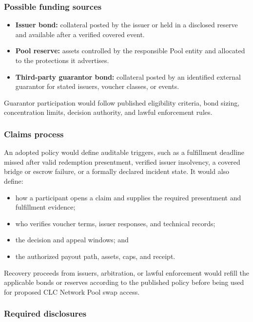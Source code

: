 \documentclass[11pt]{article}
\begin{document}
\subsubsection*{Possible funding sources}

\begin{itemize}[leftmargin=*]
\item \textbf{Issuer bond:} collateral posted by the issuer or held in a disclosed reserve and available after a verified covered event.
\item \textbf{Pool reserve:} assets controlled by the responsible Pool entity and allocated to the protections it advertises.
\item \textbf{Third-party guarantor bond:} collateral posted by an identified external guarantor for stated issuers, voucher classes, or events.
\end{itemize}
Guarantor participation would follow published eligibility criteria, bond sizing, concentration limits, decision authority, and lawful enforcement rules.

\subsubsection*{Claims process}

An adopted policy would define auditable triggers, such as a fulfillment deadline missed after valid redemption presentment, verified issuer insolvency, a covered bridge or escrow failure, or a formally declared incident state. It would also define:

\begin{itemize}[leftmargin=*]
\item how a participant opens a claim and supplies the required presentment and fulfillment evidence;
\item who verifies voucher terms, issuer responses, and technical records;
\item the decision and appeal windows; and
\item the authorized payout path, assets, caps, and receipt.
\end{itemize}
Recovery proceeds from issuers, arbitration, or lawful enforcement would refill the applicable bonds or reserves according to the published policy before being used for proposed CLC Network Pool swap access.

\subsubsection*{Required disclosures}
\end{document}
